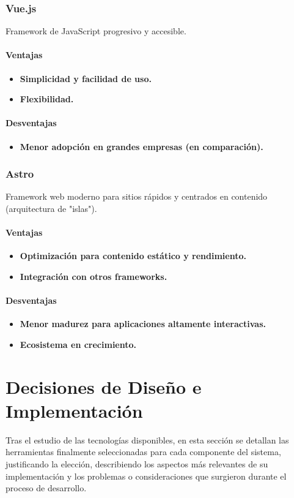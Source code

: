 \subsubsection{Vue.js}
Framework de JavaScript progresivo y accesible.
\paragraph{Ventajas}
\begin{itemize}
    \item \textbf{Simplicidad y facilidad de uso.}
    \item \textbf{Flexibilidad.}
\end{itemize}
\paragraph{Desventajas}
\begin{itemize}
    \item \textbf{Menor adopción en grandes empresas (en comparación).}
\end{itemize}

\subsubsection{Astro}
Framework web moderno para sitios rápidos y centrados en contenido (arquitectura de "islas").
\paragraph{Ventajas}
\begin{itemize}
    \item \textbf{Optimización para contenido estático y rendimiento.}
    \item \textbf{Integración con otros frameworks.}
\end{itemize}
\paragraph{Desventajas}
\begin{itemize}
    \item \textbf{Menor madurez para aplicaciones altamente interactivas.}
    \item \textbf{Ecosistema en crecimiento.}
\end{itemize}

\clearpage
\section{Decisiones de Diseño e Implementación}
\label{sec:decisiones_implementacion}
Tras el estudio de las tecnologías disponibles, en esta sección se detallan las herramientas finalmente seleccionadas para cada componente del sistema, justificando la elección, describiendo los aspectos más relevantes de su implementación y los problemas o consideraciones que surgieron durante el proceso de desarrollo.

